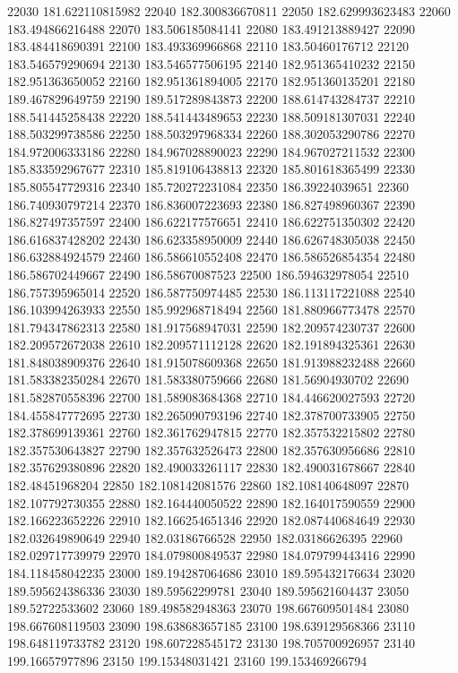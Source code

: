 {22030 181.622110815982
22040 182.300836670811
22050 182.629993623483
22060 183.494866216488
22070 183.506185084141
22080 183.491213889427
22090 183.484418690391
22100 183.493369966868
22110 183.50460176712
22120 183.546579290694
22130 183.546577506195
22140 182.951365410232
22150 182.951363650052
22160 182.951361894005
22170 182.951360135201
22180 189.467829649759
22190 189.517289843873
22200 188.614743284737
22210 188.541445258438
22220 188.541443489653
22230 188.509181307031
22240 188.503299738586
22250 188.503297968334
22260 188.302053290786
22270 184.972006333186
22280 184.967028890023
22290 184.967027211532
22300 185.833592967677
22310 185.819106438813
22320 185.801618365499
22330 185.805547729316
22340 185.720272231084
22350 186.39224039651
22360 186.740930797214
22370 186.836007223693
22380 186.827498960367
22390 186.827497357597
22400 186.622177576651
22410 186.622751350302
22420 186.616837428202
22430 186.623358950009
22440 186.626748305038
22450 186.632884924579
22460 186.586610552408
22470 186.586526854354
22480 186.586702449667
22490 186.58670087523
22500 186.594632978054
22510 186.757395965014
22520 186.587750974485
22530 186.113117221088
22540 186.103994263933
22550 185.992968718494
22560 181.880966773478
22570 181.794347862313
22580 181.917568947031
22590 182.209574230737
22600 182.209572672038
22610 182.209571112128
22620 182.191894325361
22630 181.848038909376
22640 181.915078609368
22650 181.913988232488
22660 181.583382350284
22670 181.583380759666
22680 181.56904930702
22690 181.582870558396
22700 181.589083684368
22710 184.446620027593
22720 184.455847772695
22730 182.265090793196
22740 182.378700733905
22750 182.378699139361
22760 182.361762947815
22770 182.357532215802
22780 182.357530643827
22790 182.357632526473
22800 182.357630956686
22810 182.357629380896
22820 182.490033261117
22830 182.490031678667
22840 182.48451968204
22850 182.108142081576
22860 182.108140648097
22870 182.107792730355
22880 182.164440050522
22890 182.164017590559
22900 182.166223652226
22910 182.166254651346
22920 182.087440684649
22930 182.032649890649
22940 182.03186766528
22950 182.03186626395
22960 182.029717739979
22970 184.079800849537
22980 184.079799443416
22990 184.118458042235
23000 189.194287064686
23010 189.595432176634
23020 189.595624386336
23030 189.59562299781
23040 189.595621604437
23050 189.52722533602
23060 189.498582948363
23070 198.667609501484
23080 198.667608119503
23090 198.638683657185
23100 198.639129568366
23110 198.648119733782
23120 198.607228545172
23130 198.705700926957
23140 199.16657977896
23150 199.15348031421
23160 199.153469266794
}
